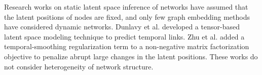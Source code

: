 Research works on static latent space inference of networks \cite{sarkar2005dynamic,menon2011link,yin2013scalable,qi2013link,ye2013predicting} have assumed that the latent positions of nodes are fixed, and only few graph embedding methods \cite{fu2009dynamic,dunlavy2011temporal,Zhu2016} have considered dynamic networks. Dunlavy et al. \cite{dunlavy2011temporal} developed a tensor-based latent space modeling technique to predict temporal links. Zhu et al. \cite{Zhu2016} added a temporal-smoothing regularization term to a non-negative matrix factorization objective to penalize abrupt large changes in the latent positions.%
These works do not consider heterogeneity of network structure.









